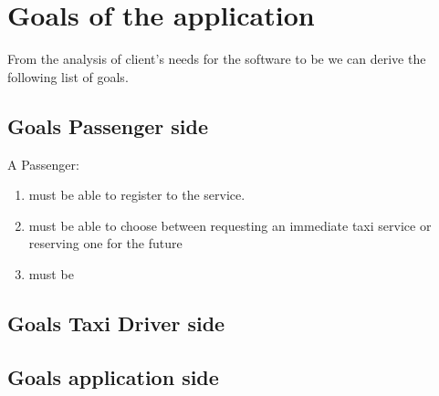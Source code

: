 \section{Goals of the application}
From the analysis of client's needs for the software to be we can derive the following list of goals.
\subsection{Goals Passenger side}
A Passenger:
\begin{enumerate}
\item must be able to register to the service.
\item  must be able to choose between requesting an immediate taxi service or reserving one for the future
\item must be   
\end{enumerate}
\subsection{Goals Taxi Driver side}
\subsection{Goals application side}
